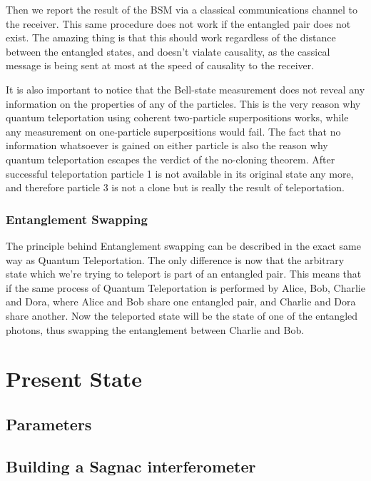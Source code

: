 \documentclass{article}
\theoremstyle{mytheoremstyle}
\theoremstyle{mytheoremstyle}
\theoremstyle{myproblemstyle}
\begin{document}
Then we report the result of the BSM via a classical communications channel to the receiver.
This same procedure does not work if the entangled pair does not exist.
The amazing thing is that this should work regardless of the distance between the entangled states,
and doesn't vialate causality, as the cassical message is being sent at most at the speed of causality to the receiver.

It is also important to notice that the Bell-state measurement does not reveal any information
on the properties of any of the particles. This is the very reason why
quantum teleportation using coherent two-particle superpositions works,
while any measurement on one-particle superpositions would fail.
The fact that no information whatsoever is gained on either particle is also the reason
why quantum teleportation escapes the verdict of the no-cloning theorem. After successful teleportation
particle 1 is not available in its original state any more,
and therefore particle 3 is not a clone but is really the result of teleportation.

\subsubsection{Entanglement Swapping}
The principle behind Entanglement swapping can be described in the exact same way as Quantum Teleportation. The only difference is now that the arbitrary
state which we're trying to teleport is part of an entangled pair. This means that if the same process of Quantum Teleportation is performed by Alice, Bob,
Charlie and Dora, where Alice and Bob share one entangled pair, and Charlie and Dora share another. Now the teleported state will be the state of 
one of the entangled photons, thus swapping the entanglement between Charlie and Bob.

\section{Present State}
\subsection{Parameters}
\subsection{Building a Sagnac interferometer}
\end{document}
